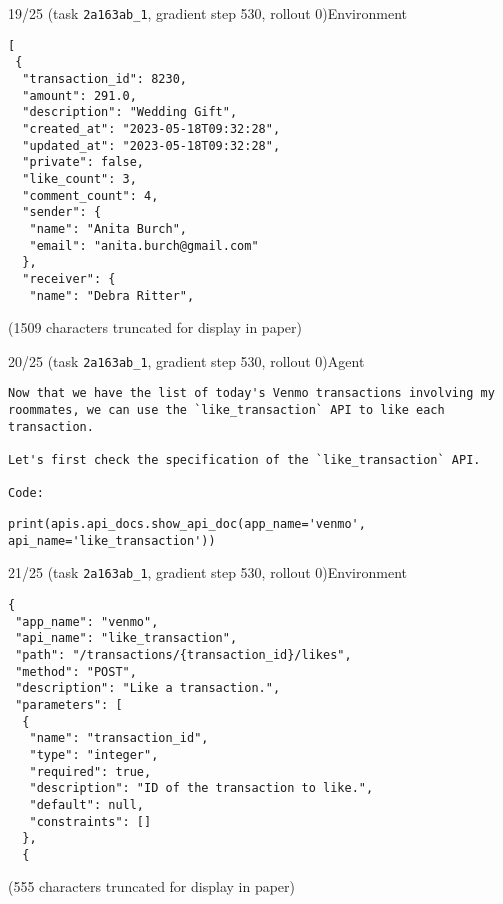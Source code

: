\hspace*{8mm}%
\begin{minipage}{0.95\linewidth}
\begin{user_message_box}{{19/25 (task \texttt{2a163ab\_1}, gradient step 530, rollout 0)\hfill Environment}}
\scriptsize
\begin{Verbatim}[breaklines]
[
 {
  "transaction_id": 8230,
  "amount": 291.0,
  "description": "Wedding Gift",
  "created_at": "2023-05-18T09:32:28",
  "updated_at": "2023-05-18T09:32:28",
  "private": false,
  "like_count": 3,
  "comment_count": 4,
  "sender": {
   "name": "Anita Burch",
   "email": "anita.burch@gmail.com"
  },
  "receiver": {
   "name": "Debra Ritter",
\end{Verbatim}
(1509 characters truncated for display in paper)\end{user_message_box}
\end{minipage}

\begin{minipage}{0.95\linewidth}
\begin{assistant_message_box}{{20/25 (task \texttt{2a163ab\_1}, gradient step 530, rollout 0)\hfill Agent}}
\scriptsize
\begin{Verbatim}[breaklines]
Now that we have the list of today's Venmo transactions involving my roommates, we can use the `like_transaction` API to like each transaction. 

Let's first check the specification of the `like_transaction` API.

Code:
\end{Verbatim}
\begin{tcolorbox}[colback=codebgcolor,boxrule=0pt]\begin{Verbatim}[breaklines]
print(apis.api_docs.show_api_doc(app_name='venmo', api_name='like_transaction'))
\end{Verbatim}
\end{tcolorbox}\end{assistant_message_box}
\end{minipage}

\hspace*{8mm}%
\begin{minipage}{0.95\linewidth}
\begin{user_message_box}{{21/25 (task \texttt{2a163ab\_1}, gradient step 530, rollout 0)\hfill Environment}}
\scriptsize
\begin{Verbatim}[breaklines]
{
 "app_name": "venmo",
 "api_name": "like_transaction",
 "path": "/transactions/{transaction_id}/likes",
 "method": "POST",
 "description": "Like a transaction.",
 "parameters": [
  {
   "name": "transaction_id",
   "type": "integer",
   "required": true,
   "description": "ID of the transaction to like.",
   "default": null,
   "constraints": []
  },
  {
\end{Verbatim}
(555 characters truncated for display in paper)\end{user_message_box}
\end{minipage}

